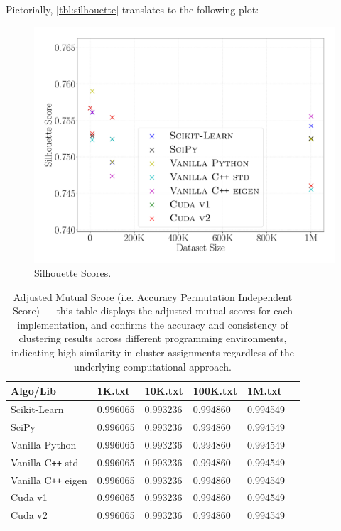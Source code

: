 \documentclass{article}
\begin{document}
  Pictorially, \autoref{tbl:silhouette} translates to the following plot:
  \begin{figure}[H]
    \centering
    \includegraphics[scale=0.25]{figures/silhouette.pdf}
    \caption{Silhouette Scores.}
  \end{figure}

  \begin{table}[H]
    \centering
    \begin{tabular}{|P{4cm}|P{2.5cm}|P{2.5cm}|P{2.5cm}|P{2.5cm}|P{2.5cm}|}
      \hline
      {\sf Algo/Lib} & {\sf 1K.txt} & {\sf 10K.txt} & {\sf 100K.txt} & {\sf 1M.txt} \\ \hline
      {\sc Scikit-Learn} & 0.996065 & 0.993236 & 0.994860 & 0.994549 \\
      {\sc SciPy} & 0.996065 & 0.993236 & 0.994860 & 0.994549 \\
      {\sc Vanilla Python} & 0.996065 & 0.993236 & 0.994860 & 0.994549 \\
      {\sc Vanilla C{\tt++} std} & 0.996065 & 0.993236 & 0.994860 & 0.994549 \\
      {\sc Vanilla C{\tt++} eigen} & 0.996065 & 0.993236 & 0.994860 & 0.994549 \\
      {\sc Cuda v1} & 0.996065 & 0.993236 & 0.994860 & 0.994549 \\
      {\sc Cuda v2} & 0.996065 & 0.993236 & 0.994860 & 0.994549 \\ \hline
    \end{tabular}
    \caption{
      Adjusted Mutual Score (i.e. Accuracy Permutation Independent Score) --- this
      table displays the adjusted mutual scores for each implementation, and confirms
      the accuracy and consistency of clustering results across different programming
      environments, indicating high similarity in cluster assignments regardless of
      the underlying computational approach.
    }
    \label{tbl:accuracy}
  \end{table}
\end{document}

